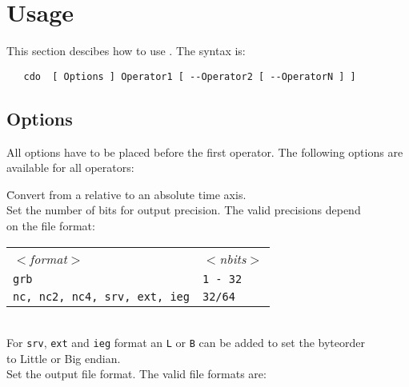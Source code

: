 \section{Usage}

This section descibes how to use {\CDO}.
The syntax is:
\begin{verbatim}
   cdo  [ Options ] Operator1 [ --Operator2 [ --OperatorN ] ]
\end{verbatim}


\subsection{Options}

All options have to be placed before the first operator.
The following options are available for all operators:

\begin{tabbing}
         \= Convert from a relative to an absolute time axis. \\
         \> Set the number of bits for output precision. The valid precisions depend \\
         \> on the file format:\\
         \> \parbox[r]{3in}{
              \vspace*{1mm}
              \hspace*{0cm}\begin{tabular}{|l|l|}
              \hline
              \rowcolor[gray]{.9}
                \sl $<$format$>$ & \sl $<$nbits$>$ \\
                {\tt grb}                         & {\tt 1 - 32} \\
                {\tt nc, nc2, nc4, srv, ext, ieg} & {\tt 32/64}   \\
              \hline
              \end{tabular}
              \vspace*{1mm}
            } \\
         \> For {\tt srv}, {\tt ext} and {\tt ieg} format an {\tt L} or {\tt B} can be added to set the byteorder \\
         \> to Little or Big endian. \\
         \> Set the output file format. The valid file formats are: \\

\end{tabbing}
